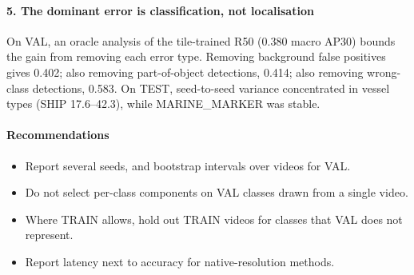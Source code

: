 \paragraph{5. The dominant error is classification, not localisation}
On VAL, an oracle analysis of the tile-trained R50 (0.380 macro AP30) bounds the gain from removing each error type. Removing background false positives gives 0.402; also removing part-of-object detections, 0.414; also removing wrong-class detections, 0.583. On TEST, seed-to-seed variance concentrated in vessel types (SHIP 17.6--42.3), while MARINE\_MARKER was stable.

\paragraph{Recommendations}
\begin{itemize}
\item Report several seeds, and bootstrap intervals over videos for VAL.
\item Do not select per-class components on VAL classes drawn from a single video.
\item Where TRAIN allows, hold out TRAIN videos for classes that VAL does not represent.
\item Report latency next to accuracy for native-resolution methods.
\end{itemize}
